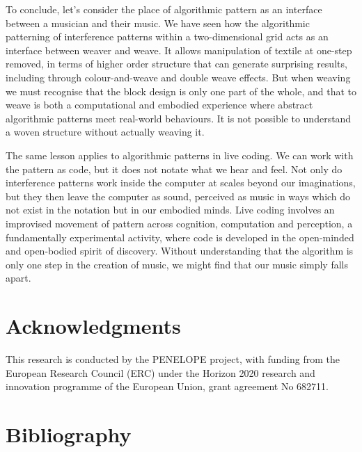 \documentclass{nime-alternate} %
\begin{document}
To conclude, let's consider the place of algorithmic pattern as an
interface between a musician and their music. We have seen how the
algorithmic patterning of interference patterns within a two-dimensional
grid acts as an interface between weaver and weave. It allows
manipulation of textile at one-step removed, in terms of higher order
structure that can generate surprising results, including through
colour-and-weave and double weave effects. But when weaving we must
recognise that the block design is only one part of the whole, and that
to weave is both a computational and embodied experience where abstract
algorithmic patterns meet real-world behaviours. It is not possible to
understand a woven structure without actually weaving it.

The same lesson applies to algorithmic patterns in live coding. We can
work with the pattern as code, but it does not notate what we hear and
feel. Not only do interference patterns work inside the computer at
scales beyond our imaginations, but they then leave the computer as
sound, perceived as music in ways which do not exist in the notation but
in our embodied minds. Live coding involves an improvised movement of
pattern across cognition, computation and perception, a fundamentally
experimental activity, where code is developed in the open-minded and
open-bodied spirit of discovery. Without understanding that the
algorithm is only one step in the creation of music, we might find that
our music simply falls apart.

\hypertarget{acknowledgments}{%
\section{Acknowledgments}\label{acknowledgments}}

This research is conducted by the PENELOPE project, with funding from
the European Research Council (ERC) under the Horizon 2020 research and
innovation programme of the European Union, grant agreement No 682711.

\hypertarget{bibliography}{%
\section{Bibliography}\label{bibliography}}

\small
\end{document}
